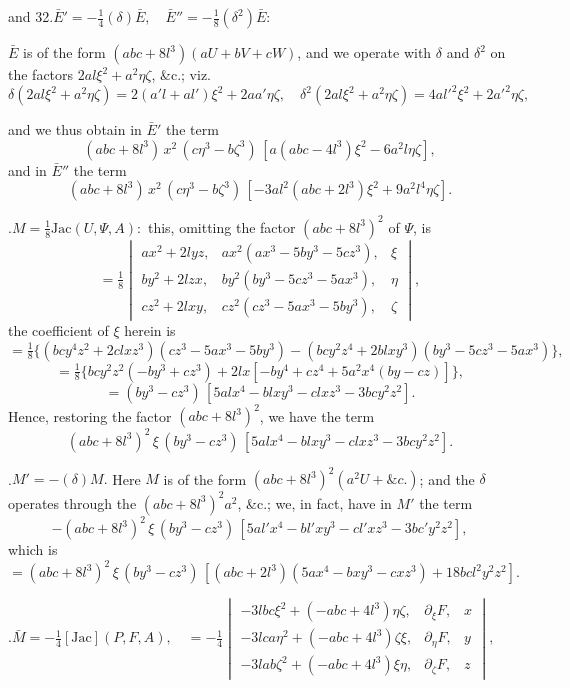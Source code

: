 \documentclass[11pt,a4paper]{article}
\begin{document}
\medskip{} and 32.\quad $\bar E'=-\tfrac{1}{4}(\delta)\bar E,\quad \bar E''=-\tfrac{1}{8}(\delta^{2})\bar E:$

$\bar E$ is of the form $(abc+8l^{3})(aU+bV+cW)$, and we operate with $\delta$ and $\delta^{2}$ on the factors $2al\xi^{2}+a^{2}\eta\zeta$, \&c.; viz.
\[
  \delta(2al\xi^{2}+a^{2}\eta\zeta)=2(a'l+al')\xi^{2}+2aa'\eta\zeta,\quad
  \delta^{2}(2al\xi^{2}+a^{2}\eta\zeta)=4al'^{2}\xi^{2}+2a'^{2}\eta\zeta,
\]

\newpage
\noindent
and we thus obtain in $\bar E'$ the term
\[
  (abc+8l^{3})\,x^{2}\,(c\eta^{3}-b\zeta^{3})\,[a(abc-4l^{3})\xi^{2}-6a^{2}l\eta\zeta],
\]
and in $\bar E''$ the term
\[
  (abc+8l^{3})\,x^{2}\,(c\eta^{3}-b\zeta^{3})\,[-3al^{2}(abc+2l^{3})\xi^{2}+9a^{2}l^{4}\eta\zeta].
\]

\medskip{}.\quad $M=\tfrac{1}{8}\mathrm{Jac}(U,\Psi,A):$ this, omitting the factor $(abc+8l^{3})^{2}$ of $\Psi$, is
\[
  =\tfrac{1}{8}\begin{vmatrix}
   ax^{2}+2lyz, & ax^{2}(ax^{3}-5by^{3}-5cz^{3}), & \xi\\
   by^{2}+2lzx, & by^{2}(by^{3}-5cz^{3}-5ax^{3}), & \eta\\
   cz^{2}+2lxy, & cz^{2}(cz^{3}-5ax^{3}-5by^{3}), & \zeta
  \end{vmatrix},
\]
the coefficient of $\xi$ herein is
\[
  =\tfrac{1}{8}\{(bcy^{4}z^{2}+2clxz^{3})(cz^{3}-5ax^{3}-5by^{3})-(bcy^{2}z^{4}+2blxy^{3})(by^{3}-5cz^{3}-5ax^{3})\},
\]
\[
  =\tfrac{1}{8}\{bcy^{2}z^{2}(-by^{3}+cz^{3})+2lx[-by^{4}+cz^{4}+5a^{2}x^{4}(by-cz)]\},
\]
\[
  =(by^{3}-cz^{3})\,[5alx^{4}-blxy^{3}-clxz^{3}-3bcy^{2}z^{2}].
\]
Hence, restoring the factor $(abc+8l^{3})^{2}$, we have the term
\[
  (abc+8l^{3})^{2}\,\xi\,(by^{3}-cz^{3})\,[5alx^{4}-blxy^{3}-clxz^{3}-3bcy^{2}z^{2}].
\]

\medskip{}.\quad $M'=-(\delta)M.$ Here $M$ is of the form $(abc+8l^{3})^{2}(a^{2}U+\&c.)$; and the $\delta$ operates through the $(abc+8l^{3})^{2}a^{2}$, \&c.; we, in fact, have in $M'$ the term
\[
  -(abc+8l^{3})^{2}\,\xi\,(by^{3}-cz^{3})\,[5al'x^{4}-bl'xy^{3}-cl'xz^{3}-3bc'y^{2}z^{2}],
\]
which is
\[
  =(abc+8l^{3})^{2}\,\xi\,(by^{3}-cz^{3})\,[(abc+2l^{3})(5ax^{4}-bxy^{3}-cxz^{3})+18bcl^{2}y^{2}z^{2}].
\]

\medskip{}.\quad $\bar M=-\tfrac{1}{4}[\mathrm{Jac}](P,F,A),\quad =-\tfrac{1}{4}\begin{vmatrix}
   -3lbc\xi^{2}+(-abc+4l^{3})\eta\zeta, & \partial_{\xi}F, & x\\
   -3lca\eta^{2}+(-abc+4l^{3})\zeta\xi, & \partial_{\eta}F, & y\\
   -3lab\zeta^{2}+(-abc+4l^{3})\xi\eta, & \partial_{\zeta}F, & z
\end{vmatrix},$
\end{document}
